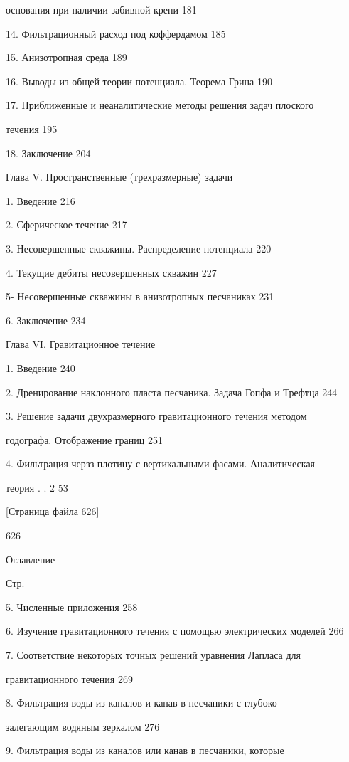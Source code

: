\documentclass[
  11pt,
]{article}
\begin{document}
основания при наличии забивной крепи 181 \par
14. Фильтрационный расход под коффердамом 185 \par
15. Анизотропная среда 189 \par
16. Выводы из общей теории потенциала. Теорема Грина 190 \par
17. Приближенные и неаналитические методы решения задач плоского  \par
течения 195 \par
18. Заключение 204 \par
Глава V. Пространственные (трехразмерные) задачи \par
1. Введение 216 \par
2. Сферическое течение 217 \par
3. Несовершенные скважины. Распределение потенциала 220 \par
4. Текущие дебиты несовершенных скважин 227 \par
5- Несовершенные скважины в анизотропных песчаниках 231 \par
6. Заключение 234 \par
Глава VI. Гравитационное течение \par
1. Введение 240 \par
2. Дренирование наклонного пласта песчаника. Задача Гопфа и Трефтца 244 \par
3. Решение задачи двухразмерного гравитационного течения методом  \par
годографа. Отображение границ 251 \par
4. Фильтрация черзз плотину с вертикальными фасами. Аналитическая \par
теория . . 2 53 \par
\smallskip
\smallskip
\smallskip
{[}Страница файла 626{]}\par
626 \par
Оглавление \par
Стр. \par
5. Численные приложения 258 \par
6. Изучение гравитационного течения с помощью электрических моделей 266 \par
7. Соответствие некоторых точных решений уравнения Лапласа для  \par
гравитационного течения 269 \par
8. Фильтрация воды из каналов и канав в песчаники с глубоко  \par
залегающим водяным зеркалом 276 \par
9. Фильтрация воды из каналов или канав в песчаники, которые  \par
\end{document}
